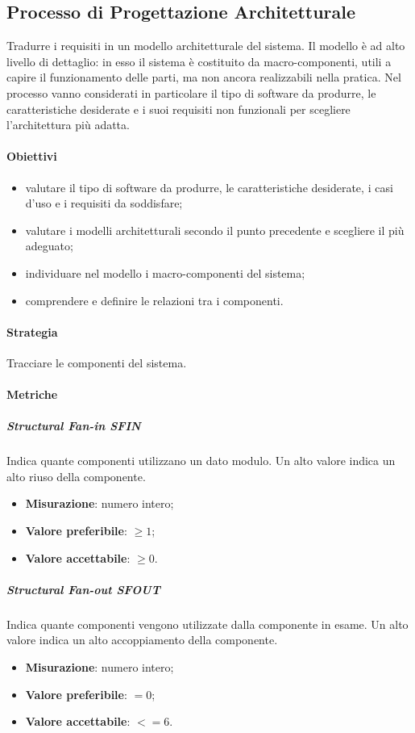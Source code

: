 	\subsection{Processo di Progettazione Architetturale}
	Tradurre i requisiti in un modello architetturale del sistema.
	Il modello è ad alto livello di dettaglio: in esso il sistema è costituito da macro-componenti, utili a capire il funzionamento delle parti, ma non ancora realizzabili nella pratica.\newline
	Nel processo vanno considerati in particolare il tipo di software da produrre, le caratteristiche desiderate e i suoi requisiti non funzionali per scegliere l'architettura più adatta.
		\paragraph{Obiettivi}
		\begin{itemize}
			\item valutare il tipo di software da produrre, le caratteristiche desiderate, i casi d'uso e i requisiti da soddisfare;
			\item valutare i modelli architetturali secondo il punto precedente e scegliere il più adeguato;
			\item individuare nel modello i macro-componenti del sistema;
			\item comprendere e definire le relazioni tra i componenti.
		\end{itemize}
		\paragraph{Strategia}
		Tracciare le componenti del sistema.
		\paragraph{Metriche}
			\subparagraph{Structural Fan-in \textbf{SFIN}}
			Indica quante componenti utilizzano un dato modulo. Un alto valore indica un alto riuso della componente.
			\begin{itemize}
				\item \textbf{Misurazione}: numero intero;
				\item \textbf{Valore preferibile}: $\geq 1$;
				\item \textbf{Valore accettabile}: $\geq 0$.
			\end{itemize}
			\subparagraph{Structural Fan-out \textbf{SFOUT}}
			Indica quante componenti vengono utilizzate dalla componente in esame. Un alto valore indica un alto
accoppiamento della componente.
			\begin{itemize}
				\item \textbf{Misurazione}: numero intero;
				\item \textbf{Valore preferibile}: $=0$;
				\item \textbf{Valore accettabile}: $<=6$.
			\end{itemize}
			
